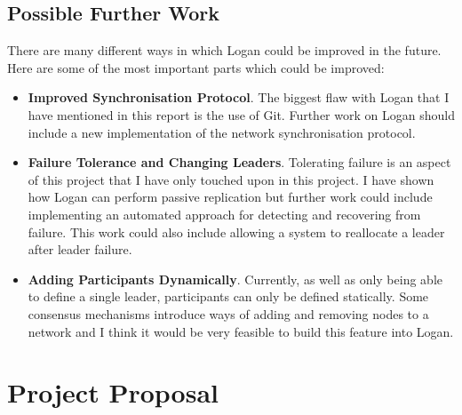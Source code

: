 \documentclass[12pt,a4paper,twoside,openright]{report}
\begin{document}
	\section{Possible Further Work}
	There are many different ways in which Logan could be improved in the future.
	Here are some of the most important parts which could be improved:
	\begin{itemize}
	\item \textbf{Improved Synchronisation Protocol}.
	The biggest flaw with Logan that I have mentioned in this report is the use of Git.
	Further work on Logan should include a new implementation of the network synchronisation protocol.
	\item \textbf{Failure Tolerance and Changing Leaders}.
	Tolerating failure is an aspect of this project that I have only touched upon in this project. 
	I have shown how Logan can perform passive replication but further work could include implementing an automated approach for detecting and recovering from failure. 
	This work could also include allowing a system to reallocate a leader after leader failure.
	\item \textbf{Adding Participants Dynamically}.
	Currently, as well as only being able to define a single leader, participants can only be defined statically. 
	Some consensus mechanisms introduce ways of adding and removing nodes to a network and I think it would be very feasible to build this feature into Logan.
	\end{itemize}

	\printbibliography
	
	\appendix

	\chapter{Project Proposal}
	
	
	
	
\end{document}
